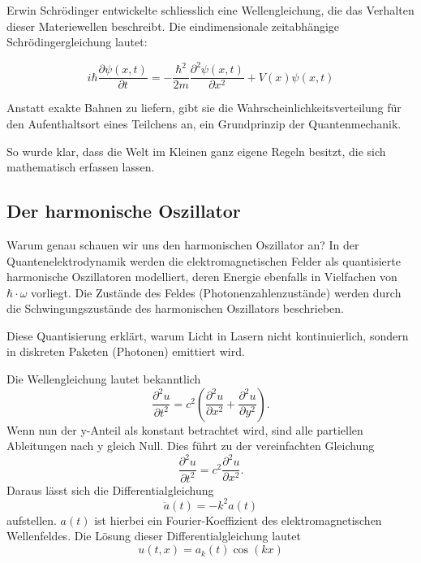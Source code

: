 	
	Erwin Schrödinger entwickelte schliesslich eine Wellengleichung, die das Verhalten dieser Materiewellen beschreibt. Die eindimensionale zeitabhängige Schrödingergleichung lautet:
	
	
	\begin{equation}
		i \hbar \frac{\partial \psi(x,t)}{\partial t} = -\frac{\hbar^2}{2m} \frac{\partial^2 \psi(x,t)}{\partial x^2} + V(x) \psi(x,t)
	\end{equation}
	
	
	Anstatt exakte Bahnen zu liefern, gibt sie die Wahrscheinlichkeitsverteilung für den Aufenthaltsort eines Teilchens an, ein Grundprinzip der Quantenmechanik.
	
	So wurde klar, dass die Welt im Kleinen ganz eigene Regeln besitzt, die sich mathematisch erfassen lassen.
	
	
	

\subsection{Der harmonische Oszillator\label{fourier:subsection:derHarmonischeOszillator}}
Warum genau schauen wir uns den harmonischen Oszillator an?
In der Quantenelektrodynamik werden die elektromagnetischen Felder als quantisierte harmonische Oszillatoren modelliert, deren Energie ebenfalls in Vielfachen von $\hbar\cdot\omega$ vorliegt.
Die Zustände des Feldes (Photonenzahlenzustände) werden durch die Schwingungszustände des harmonischen Oszillators beschrieben.

Diese Quantisierung erklärt, warum Licht in Lasern nicht kontinuierlich, sondern in diskreten Paketen (Photonen) emittiert wird. %

Die Wellengleichung lautet bekanntlich
\begin{equation}
    \frac{\partial^2 u}{\partial t^2} = c^2 \left( \frac{\partial^2 u}{\partial x^2} + \frac{\partial^2 u}{\partial y^2} \right).
\end{equation}
Wenn nun der y-Anteil als konstant betrachtet wird, sind alle partiellen Ableitungen nach y gleich Null.
Dies führt zu der vereinfachten Gleichung
\begin{equation}
    \frac{\partial^2 u}{\partial t^2} = c^2 \frac{\partial^2 u}{\partial x^2}.
\end{equation}
Daraus lässt sich die Differentialgleichung
\begin{equation}
    \ddot{a}(t) = -k^2 a(t)
\end{equation}
aufstellen.
$a(t)$ ist hierbei ein Fourier-Koeffizient des elektromagnetischen Wellenfeldes.
Die Lösung dieser Differentialgleichung lautet
\begin{equation}
    u(t,x) = a_k(t) \cos(kx)
\end{equation}

